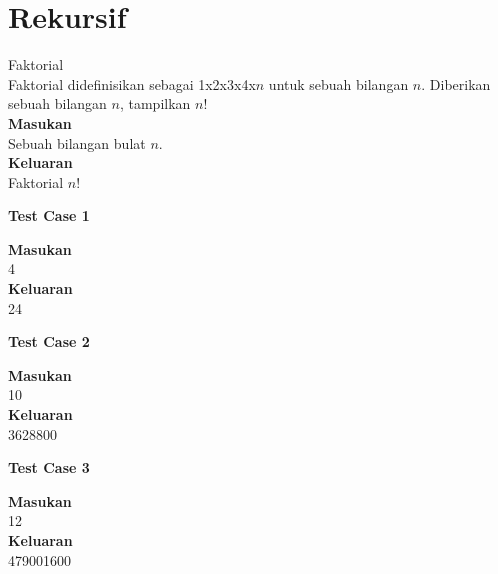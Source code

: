 \chapter{Rekursif}

\begin{permasalahan}{Faktorial}\\
	Faktorial didefinisikan sebagai 1x2x3x4x$n$ untuk sebuah bilangan $n$. Diberikan sebuah bilangan $n$, tampilkan $n!$\\
	\textbf{Masukan}\\
	Sebuah bilangan bulat $n$.\\
	\textbf{Keluaran}\\
	Faktorial $n!$\\
	\begin{center}
	\textbf{Test Case 1}\\
	\end{center}
	\textbf{Masukan}\\
	4\\
	\textbf{Keluaran}\\
	24\\
	\begin{center}
	\textbf{Test Case 2}\\
	\end{center}
	\textbf{Masukan}\\
	10\\
	\textbf{Keluaran}\\
	3628800\\
	\begin{center}
	\textbf{Test Case 3}\\
	\end{center}
	\textbf{Masukan}\\
	12\\
	\textbf{Keluaran}\\
	479001600\\
\end{permasalahan}

